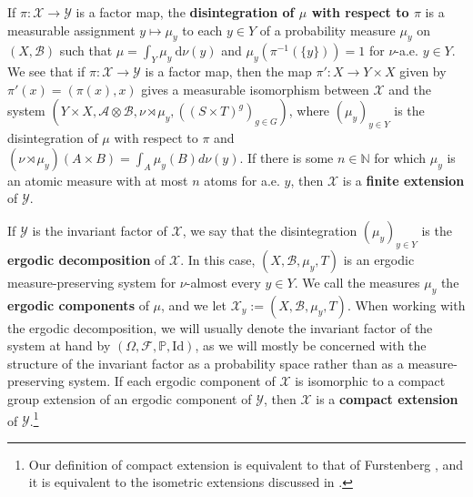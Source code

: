\documentclass[graybox]{svmult}
\theoremstyle{definition}
\renewcommand{\d}{~\mathrm{d}}
\newcommand{\XX}{\mathcal{X}}
\newcommand{\YY}{\mathcal{Y}}
\renewcommand{\emph}[1]{\textbf{#1}}
\begin{document}
If $\pi:\XX\to\YY$ is a factor map, the \emph{disintegration of $\mu$ with respect to $\pi$} is a measurable assignment $y\mapsto\mu_y$ to each $y\in Y$ of a probability measure $\mu_y$ on $(X,\mathscr{B})$ such that $\mu=\int_Y\mu_y\d\nu(y)$ and $\mu_y(\pi^{-1}(\{y\}))=1$ for $\nu$-a.e. $y\in Y$. 
We see that if $\pi:\mathcal{X}\rightarrow\mathcal{Y}$ is a factor map, then the map $\pi':X\rightarrow Y\times X$ given by $\pi'(x) = (\pi(x),x)$ gives a measurable isomorphism between $\mathcal{X}$ and the system $(Y\times X,\mathscr{A}\otimes\mathscr{B},\nu\rtimes\mu_y,((S\times T)^g)_{g \in G})$, where $(\mu_y)_{y \in Y}$ is the disintegration of $\mu$ with respect to $\pi$ and $(\nu\rtimes\mu_y)(A\times B) = \int_A\mu_y(B)d\nu(y)$.
If there is some $n \in \mathbb{N}$ for which $\mu_y$ is an atomic measure with at most $n$ atoms for a.e. $y$, then $\mathcal{X}$ is a \textbf{finite extension} of $\mathcal{Y}$.

If $\YY$ is the invariant factor of $\XX$, we say that the disintegration $(\mu_y)_{y\in Y}$ is the \emph{ergodic decomposition} of $\XX$.
In this case, $(X,\mathscr{B},\mu_y,T)$ is an ergodic measure-preserving system for $\nu$-almost every $y\in Y$.
We call the measures $\mu_y$ the \emph{ergodic components} of $\mu$, and we let $\mathcal{X}_y := (X,\mathscr{B},\mu_y,T)$.
When working with the ergodic decomposition, we will usually denote the invariant factor of the system at hand by $(\Omega,\mathscr{F},\mathbb{P},\text{Id})$, as we will mostly be concerned with the structure of the invariant factor as a probability space rather than as a measure-preserving system.
If each ergodic component of $\mathcal{X}$ is isomorphic to a compact group extension of an ergodic component of $\mathcal{Y}$, then $\mathcal{X}$ is a \textbf{compact extension} of $\mathcal{Y}$.\footnote{Our definition of compact extension is equivalent to that of Furstenberg \cite[Chapter 6]{FBook}, and it is equivalent to the isometric extensions discussed in \cite[Chapter 9]{ErgodicTheoryViaJoinings}.}

\end{document}
